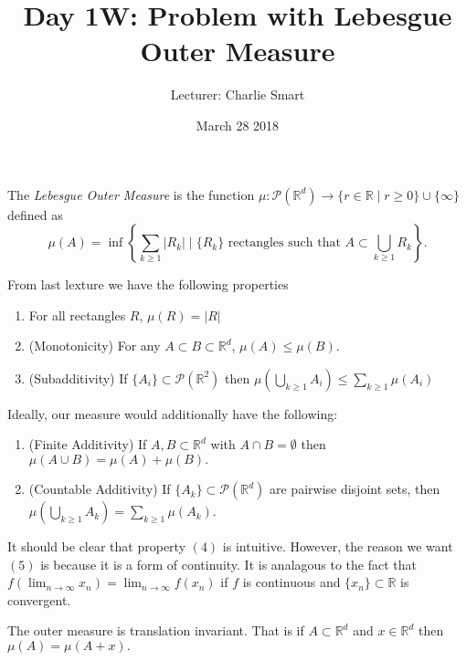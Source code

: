 \documentclass{amsart}
\title{Day 1W: Problem with Lebesgue Outer Measure}
\date{March 28 2018}
\author{Lecturer: Charlie Smart}
\newcommand{\braces}[1]{\left\{ #1\right\}}
\theoremstyle{definition}
\numberwithin{equation}{section}
\newcommand{\s}[1]{\{#1\}}
\newcommand{\SET}[1]{\braces{#1}}
\newcommand{\R}{\mathbb{R}}
\newcommand{\PP}{\mathcal{P}}
\newcommand{\limin}{\lim_{n\to\infty}}
\begin{document}
  \maketitle

  \begin{definition}

    The \emph{Lebesgue Outer Measure} is the function $\mu:\PP(\R^d) \to \s{r \in \R \mid r \geq 0} \cup \s{\infty}$ defined as
    \[\mu(A) = \inf \SET{\sum_{k\geq1}|R_k| \mid \s{R_k} \text{ rectangles such that } A \subset \bigcup_{k\geq1}R_k}.\]

    From last lexture we have the following properties
    \begin{enumerate}
      \item For all rectangles $R$, $\mu(R) = |R|$
      \item (Monotonicity) For any $A \subset B \subset \R^d$, $\mu(A) \leq \mu(B).$
      \item (Subadditivity) If $\s{A_i} \subset \PP(\R^2)$ then $\mu(\bigcup_{k\geq1}A_i) \leq \sum_{k\geq1}\mu(A_i)$
    \end{enumerate}

    Ideally, our measure would additionally have the following:
    \begin{enumerate}[resume]
      \item (Finite Additivity) If $A, B \subset \R^d$ with $A \cap B = \emptyset$ then $\mu(A \cup B) = \mu(A) + \mu(B).$
      \item (Countable Additivity) If $\s{A_k} \subset \PP(\R^d)$ are pairwise disjoint sets, then $\mu(\bigcup_{k\geq1}A_k) = \sum_{k\ge1}\mu(A_k).$
    \end{enumerate}

  \end{definition}

  \begin{remark}

    It should be clear that property $(4)$ is intuitive. However, the reason we want $(5)$ is because it is a form of continuity. It is analagous to the fact that $f(\limin x_n) = \limin f(x_n)$ if $f$ is continuous and $\s{x_n} \subset \R$ is convergent.

  \end{remark}

  \begin{do-this}

    The outer measure is translation invariant. That is if $A \subset \R^d$ and $x \in \R^d$ then $\mu(A) = \mu(A + x).$

  \end{do-this}
\end{document}
